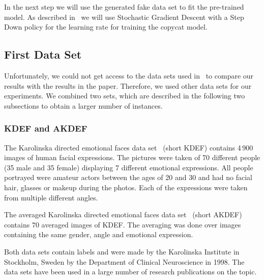 \documentclass[a4paper,11pt]{article}
\begin{document}
    In the next step we will use the generated fake data set to fit the pre-trained model.
    As described in~\cite{copycat} we will use Stochastic Gradient Descent with a Step Down policy for the learning rate for training the copycat model. 
    
    \subsection{First Data Set}
        Unfortunately, we could not get access to the data sets used in~\cite{copycat} to compare our results with the results in the paper. Therefore, we used other data sets for our experiments. We combined two sets, which are described in the following two subsections to obtain a larger number of instances.
        
        \subsubsection{KDEF and AKDEF}
            The Karolinska directed emotional faces data set~\cite{kdef} (short KDEF) contains 4\,900 images of human facial expressions. The pictures were taken of 70 different people (35 male and 35 female) displaying 7 different emotional expressions. All people portrayed were amateur actors between the ages of 20 and 30 and had no facial hair, glasses or makeup during the photos. Each of the expressions were taken from multiple different angles. 
            
            The averaged Karolinska directed emotional faces data set~\cite{kdef} (short AKDEF) contains $70$ averaged images of KDEF. The averaging was done over images containing the same gender, angle and emotional expression.
            
            Both data sets contain labels and were made by the Karolinska Institute in Stockholm, Sweden by the Department of Clinical Neuroscience in 1998. The data sets have been used in a large number of research publications on the topic. 
            
\end{document}
